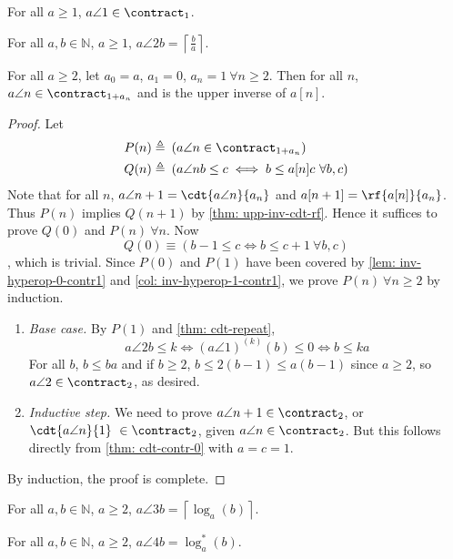 \begin{col} \label{col: inv-hyperop-1-contr1}
For all $a\ge 1$, $a\angle{1} \in \contract_1$.
\end{col}

\begin{col}
For all $a, b\in \mathbb{N}$, $a\ge 1$, $a\angle{2}b = \displaystyle \left\lceil \frac{b}{a} \right\rceil$.
\end{col}

\begin{thm}
For all $a\ge 2$, let $a_0 = a$, $a_1 = 0$, $a_n = 1 \ \forall n\ge 2$. Then for all $n$, $a\angle{n} \in \contract_{1+a_n}$ and is the upper inverse of $a[n]$.
\end{thm}
\begin{proof}
Let
$$\begin{aligned}
P(n) \triangleq & \ \left(a\angle{n} \in \contract_{1+a_n}\right)\\
Q(n) \triangleq & \ \left(a\angle{n}b \le c \iff b\le a[n]c \ \forall b, c\right)
\end{aligned}$$
Note that for all $n$, $a\angle{n+1} = \cdt{a\angle{n}}{a_n}$ and $a[n+1] = \rf{a[n]}{a_n}$. Thus $P(n)$ implies $Q(n+1)$ by \cref{thm: upp-inv-cdt-rf}. Hence it suffices to prove $Q(0)$ and $P(n)\ \forall n$. Now
$$ Q(0) \equiv \left(b - 1 \le c \iff b\le  c + 1 \ \forall b, c\right) $$
, which is trivial. Since $P(0)$ and $P(1)$ have been covered by \cref{lem: inv-hyperop-0-contr1} and \cref{col: inv-hyperop-1-contr1}, we prove $P(n)\ \forall n\ge 2$ by induction.
\begin{enumerate}[leftmargin=*]
	\item \textit{Base case.} By $P(1)$ and \cref{thm: cdt-repeat},
	$$ a\angle{2}b \le k \iff \left(a\angle{1}\right)^{(k)}(b) \le 0 \iff b \le ka $$
	For all $b$, $b\le ba$ and if $b\ge 2$, $b \le 2(b-1)\le a(b-1)$ since $a\ge 2$, so $a\angle{2} \in \contract_2$, as desired.
	\item \textit{Inductive step.} We need to prove $a\angle{n+1}\in \contract_2$, or $\cdt{a\angle{n}}{1} \ \in \contract_2$, given $a\angle{n}\in \contract_2$. But this follows directly from \cref{thm: cdt-contr-0} with $a = c = 1$.
\end{enumerate}
By induction, the proof is complete.
\end{proof}

\begin{col}
For all $a, b\in \mathbb{N}$, $a\ge 2$, $a\angle{3}b = \displaystyle \left\lceil \log_a(b) \right\rceil$.
\end{col}

\begin{col}
For all $a, b\in \mathbb{N}$, $a\ge 2$, $a\angle{4}b = \log^*_a(b) $.
\end{col}
